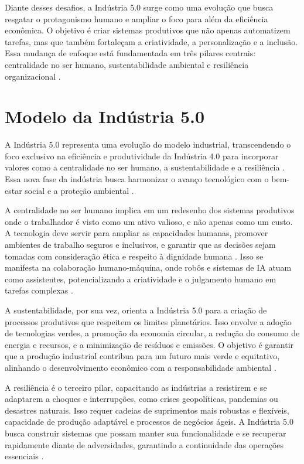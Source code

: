 Diante desses desafios, a Indústria 5.0 surge como uma evolução que busca resgatar o protagonismo humano e ampliar o foco para além da eficiência econômica. O objetivo é criar sistemas produtivos que não apenas automatizem tarefas, mas que também fortaleçam a criatividade, a personalização e a inclusão. Essa mudança de enfoque está fundamentada em três pilares centrais: centralidade no ser humano, sustentabilidade ambiental e resiliência organizacional \cite{euCommission2021, Nahavandi2019}.

\section{Modelo da Indústria 5.0}

A Indústria 5.0 representa uma evolução do modelo industrial, transcendendo o foco exclusivo na eficiência e produtividade da Indústria 4.0 para incorporar valores como a centralidade no ser humano, a sustentabilidade e a resiliência \cite{euCommission2021, Xu2021}. Essa nova fase da indústria busca harmonizar o avanço tecnológico com o bem-estar social e a proteção ambiental \cite{Nahavandi2019}.

A centralidade no ser humano implica em um redesenho dos sistemas produtivos onde o trabalhador é visto como um ativo valioso, e não apenas como um custo. A tecnologia deve servir para ampliar as capacidades humanas, promover ambientes de trabalho seguros e inclusivos, e garantir que as decisões sejam tomadas com consideração ética e respeito à dignidade humana \cite{Nahavandi2019, TOTH2023}. Isso se manifesta na colaboração humano-máquina, onde robôs e sistemas de IA atuam como assistentes, potencializando a criatividade e o julgamento humano em tarefas complexas \cite{VALETTE2023}.

A sustentabilidade, por sua vez, orienta a Indústria 5.0 para a criação de processos produtivos que respeitem os limites planetários. Isso envolve a adoção de tecnologias verdes, a promoção da economia circular, a redução do consumo de energia e recursos, e a minimização de resíduos e emissões. O objetivo é garantir que a produção industrial contribua para um futuro mais verde e equitativo, alinhando o desenvolvimento econômico com a responsabilidade ambiental \cite{euCommission2021, silva2024}.

A resiliência é o terceiro pilar, capacitando as indústrias a resistirem e se adaptarem a choques e interrupções, como crises geopolíticas, pandemias ou desastres naturais. Isso requer cadeias de suprimentos mais robustas e flexíveis, capacidade de produção adaptável e processos de negócios ágeis. A Indústria 5.0 busca construir sistemas que possam manter sua funcionalidade e se recuperar rapidamente diante de adversidades, garantindo a continuidade das operações essenciais \cite{euCommission2021, Khan2023}.

